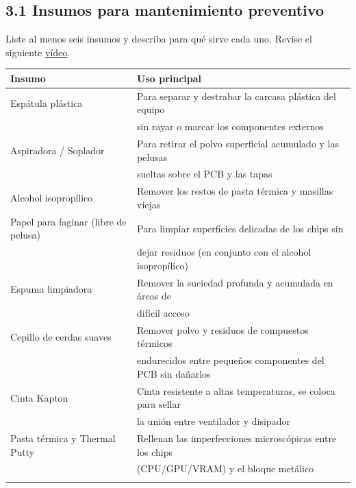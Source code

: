 \documentclass{article}
\begin{document}
\subsection{3.1 Insumos para mantenimiento preventivo}
\label{sec:org85a23be}
Liste al menos seis insumos y describa para qué sirve cada
uno. Revise el siguiente \href{https://youtu.be/3ri1BMV7XTM?si=bjYoDUUKuMWwj4Qg}{vídeo}.
\begin{center}
\begin{tabular}{ll}
Insumo & Uso principal\\[0pt]
\hline
Espátula plástica & Para separar y destrabar la carcasa plástica del equipo\\[0pt]
 & sin rayar o marcar los componentes externos\\[0pt]
Aspiradora / Soplador & Para retirar el polvo superficial acumulado y las pelusas\\[0pt]
 & sueltas sobre el PCB y las tapas\\[0pt]
Alcohol isopropílico & Remover los restos de pasta térmica y masillas viejas\\[0pt]
Papel para faginar (libre de pelusa) & Para limpiar superficies delicadas de los chips sin\\[0pt]
 & dejar residuos (en conjunto con el alcohol isopropílico)\\[0pt]
Espuma limpiadora & Remover la suciedad profunda y acumulada en áreas de\\[0pt]
 & difícil acceso\\[0pt]
Cepillo de cerdas suaves & Remover polvo y residuos de compuestos térmicos\\[0pt]
 & endurecidos entre pequeños componentes del PCB sin dañarlos\\[0pt]
Cinta Kapton & Cinta resistente a altas temperaturas, se coloca para sellar\\[0pt]
 & la unión entre ventilador y disipador\\[0pt]
Pasta térmica y Thermal Putty & Rellenan las imperfecciones microscópicas entre los chips\\[0pt]
 & (CPU/GPU/VRAM) y el bloque metálico\\[0pt]
 & \\[0pt]
\end{tabular}
\end{center}
\end{document}
